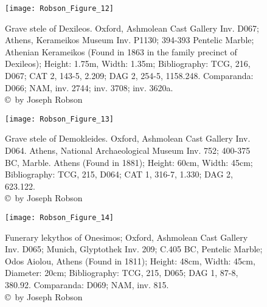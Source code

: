 \begin{figure}[!p]
	\texttt{[image: Robson\_Figure\_12]}

	\caption{Grave stele of Dexileos. Oxford, Ashmolean Cast Gallery Inv. D067; Athens, Kerameikos Museum Inv. P1130; 394-393 \BC Pentelic Marble; Athenian Kerameikos (Found in 1863 in the family precinct of Dexileos); Height: 1.75m, Width: 1.35m; Bibliography: TCG, 216, D067; CAT 2, 143-5, 2.209; DAG 2, 254-5, 1158.248.
		Comparanda: D066; NAM, inv. 2744; inv. 3708; inv. 3620a.
		{\normalfont\scriptsize \\ \copyright\ by Joseph Robson}}
	\label{fig:Robson_Figure_12}
\end{figure}


\begin{figure}[!p]
	\texttt{[image: Robson\_Figure\_13]}

	\caption{Grave stele of Demokleides. Oxford, Ashmolean Cast Gallery Inv. D064. Athens, National Archaeological Museum Inv. 752; 400-375 BC, Marble. Athens (Found in 1881); Height: 60cm, Width: 45cm; Bibliography: TCG, 215, D064; CAT 1, 316-7, 1.330; DAG 2, 623.122.
		{\normalfont\scriptsize\\ \copyright\ by Joseph Robson}}
	\label{fig:Robson_Figure_13}
\end{figure}

\begin{figure}[!p]
	\texttt{[image: Robson\_Figure\_14]}

	\caption{Funerary lekythos of Onesimos; Oxford, Ashmolean Cast Gallery Inv. D065; Munich, Glyptothek Inv. 209; C.405 BC, Pentelic Marble; Odos Aiolou, Athens (Found in 1811); Height: 48cm, Width: 45cm, Diameter: 20cm; Bibliography: TCG, 215, D065; DAG 1, 87-8, 380.92.
		Comparanda: D069; NAM, inv. 815.
		{\normalfont\scriptsize \\ \copyright\ by Joseph Robson}}
	\label{fig:Robson_Figure_14}
\end{figure}

\IJSRAclosing%
